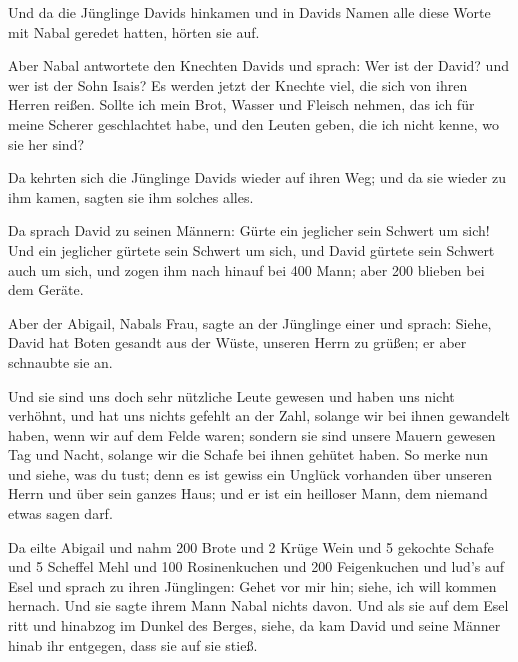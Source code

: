  Und da die Jünglinge Davids hinkamen und in Davids Namen
alle diese Worte mit Nabal geredet hatten, hörten sie auf.

 Aber Nabal antwortete den Knechten Davids und sprach:
Wer ist der David? und wer ist der Sohn Isais? Es werden jetzt der
Knechte viel, die sich von ihren Herren reißen.  Sollte
ich mein Brot, Wasser und Fleisch nehmen, das ich für meine Scherer
geschlachtet habe, und den Leuten geben, die ich nicht kenne, wo sie her
sind?

 Da kehrten sich die Jünglinge Davids wieder auf ihren
Weg; und da sie wieder zu ihm kamen, sagten sie ihm solches alles.

 Da sprach David zu seinen Männern: Gürte ein jeglicher
sein Schwert um sich! Und ein jeglicher gürtete sein Schwert um sich,
und David gürtete sein Schwert auch um sich, und zogen ihm nach hinauf
bei 400 Mann; aber 200 blieben bei dem Geräte.

 Aber der Abigail, Nabals Frau, sagte an der Jünglinge
einer und sprach: Siehe, David hat Boten gesandt aus der Wüste, unseren
Herrn zu grüßen; er aber schnaubte sie an.

 Und sie sind uns doch sehr nützliche Leute gewesen und
haben uns nicht verhöhnt, und hat uns nichts gefehlt an der Zahl,
solange wir bei ihnen gewandelt haben, wenn wir auf dem Felde waren;
 sondern sie sind unsere Mauern gewesen Tag und Nacht,
solange wir die Schafe bei ihnen gehütet haben.  So merke
nun und siehe, was du tust; denn es ist gewiss ein Unglück vorhanden
über unseren Herrn und über sein ganzes Haus; und er ist ein heilloser
Mann, dem niemand etwas sagen darf.

 Da eilte Abigail und nahm 200 Brote und 2 Krüge Wein und
5 gekochte Schafe und 5 Scheffel Mehl und 100 Rosinenkuchen und 200
Feigenkuchen und lud's auf Esel  und sprach zu ihren
Jünglingen: Gehet vor mir hin; siehe, ich will kommen hernach. Und sie
sagte ihrem Mann Nabal nichts davon.  Und als sie auf dem
Esel ritt und hinabzog im Dunkel des Berges, siehe, da kam David und
seine Männer hinab ihr entgegen, dass sie auf sie stieß.

